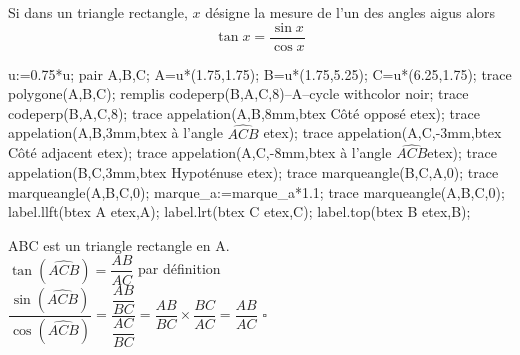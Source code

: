 \begin{propriete}
    Si dans un triangle rectangle, $x$ désigne la mesure de l'un des angles aigus alors 
    $$\tan x=\dfrac{\sin x}{\cos x}$$
\end{propriete}

\begin{preuve}

    \begin{minipage}{0.4\linewidth}
        \begin{Geometrie}[CoinHD={(5u,4.5u)}]
            u:=0.75*u;            
            pair A,B,C;
            A=u*(1.75,1.75);
            B=u*(1.75,5.25);
            C=u*(6.25,1.75);
            trace polygone(A,B,C);
            remplis codeperp(B,A,C,8)--A--cycle withcolor noir;
            trace codeperp(B,A,C,8);
            trace appelation(A,B,8mm,btex Côté opposé etex);
            trace appelation(A,B,3mm,btex à l'angle $\widehat{ACB}$ etex);
            trace appelation(A,C,-3mm,btex Côté adjacent etex);
            trace appelation(A,C,-8mm,btex à l'angle $\widehat{ACB}$etex);
            trace appelation(B,C,3mm,btex Hypoténuse etex);            
            trace marqueangle(B,C,A,0);
            trace marqueangle(A,B,C,0);
            marque_a:=marque_a*1.1;    
            trace marqueangle(A,B,C,0);
            label.llft(btex A etex,A);
            label.lrt(btex C etex,C);
            label.top(btex B etex,B);
        \end{Geometrie}
    \end{minipage}
    \begin{minipage}{0.55\linewidth}
        ABC est un triangle rectangle en A.\\\bigskip
        $\tan(\widehat{ACB})=\dfrac{AB}{AC}$ par définition\\\bigskip
        $\dfrac{\sin (\widehat{ACB})}{\cos (\widehat{ACB})}=\dfrac{\dfrac{AB}{BC}}{\dfrac{AC}{BC}}=\dfrac{AB}{BC}\times \dfrac{BC}{AC}=\dfrac{AB}{AC}$ $\square$
    \end{minipage}
\end{preuve}
